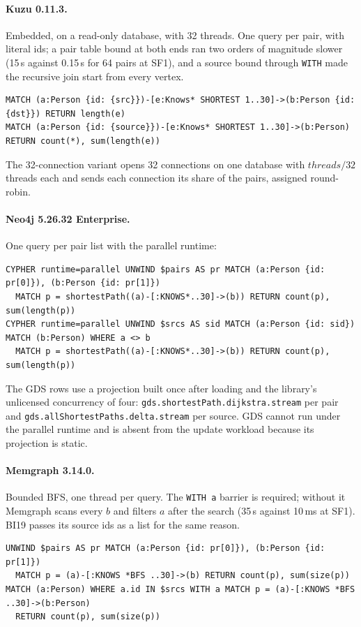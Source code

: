 \paragraph{Kuzu 0.11.3.} Embedded, on a read-only database, with 32 threads. One query per pair, with literal ids; a
pair table bound at both ends ran two orders of magnitude slower (15\,s against 0.15\,s for 64 pairs at SF1), and a
source bound through \texttt{WITH} made the recursive join start from every vertex.
\begin{lstlisting}
MATCH (a:Person {id: {src}})-[e:Knows* SHORTEST 1..30]->(b:Person {id: {dst}}) RETURN length(e)
MATCH (a:Person {id: {source}})-[e:Knows* SHORTEST 1..30]->(b:Person) RETURN count(*), sum(length(e))
\end{lstlisting}
The 32-connection variant opens 32 connections on one database with $\mathit{threads}/32$ threads each and sends each
connection its share of the pairs, assigned round-robin.

\paragraph{Neo4j 5.26.32 Enterprise.} One query per pair list with the parallel runtime:
\begin{lstlisting}
CYPHER runtime=parallel UNWIND $pairs AS pr MATCH (a:Person {id: pr[0]}), (b:Person {id: pr[1]})
  MATCH p = shortestPath((a)-[:KNOWS*..30]->(b)) RETURN count(p), sum(length(p))
CYPHER runtime=parallel UNWIND $srcs AS sid MATCH (a:Person {id: sid}) MATCH (b:Person) WHERE a <> b
  MATCH p = shortestPath((a)-[:KNOWS*..30]->(b)) RETURN count(p), sum(length(p))
\end{lstlisting}
The GDS rows use a projection built once after loading and the library's unlicensed concurrency of four:
\texttt{gds.shortestPath.dijkstra.stream} per pair and \texttt{gds.allShortestPaths.delta.stream} per source. GDS
cannot run under the parallel runtime and is absent from the update workload because its projection is static.

\paragraph{Memgraph 3.14.0.} Bounded BFS, one thread per query. The \texttt{WITH a} barrier is required; without it
Memgraph scans every $b$ and filters $a$ after the search (35\,s against 10\,ms at SF1). BI19 passes its source ids as
a list for the same reason.
\begin{lstlisting}
UNWIND $pairs AS pr MATCH (a:Person {id: pr[0]}), (b:Person {id: pr[1]})
  MATCH p = (a)-[:KNOWS *BFS ..30]->(b) RETURN count(p), sum(size(p))
MATCH (a:Person) WHERE a.id IN $srcs WITH a MATCH p = (a)-[:KNOWS *BFS ..30]->(b:Person)
  RETURN count(p), sum(size(p))
\end{lstlisting}

